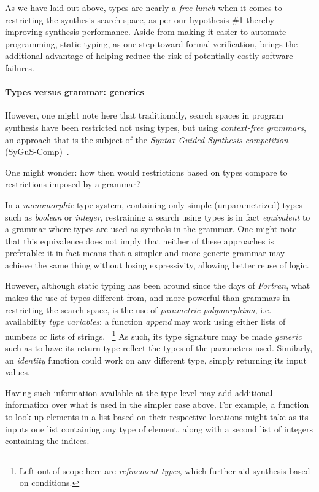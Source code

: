 \documentclass{article}
\begin{document}
As we have laid out above,
types are nearly a \emph{free lunch} when it comes to restricting the synthesis search space,
as per our hypothesis \#1
thereby improving synthesis performance.
Aside from making it easier to automate programming,
static typing, as one step toward formal verification,
brings the additional advantage of helping reduce the
risk of potentially costly software failures.%
~\citep{miller2018smart,leveson2001systemic}

\paragraph{Types versus grammar: generics}

However, one might note here that traditionally,
search spaces in program synthesis have been restricted not using types,
but using \emph{context-free grammars},
an approach that is the subject of the
\emph{Syntax-Guided Synthesis competition} (SyGuS-Comp)~\citep{sygus}.

One might wonder: how then would restrictions based on
types compare to restrictions imposed by a grammar?

In a \emph{monomorphic} type system,
containing only simple (unparametrized) types such as \emph{boolean} or \emph{integer},
restraining a search using types is in fact \emph{equivalent}
to a grammar where types are used as symbols in the grammar.
One might note that this equivalence does not imply
that neither of these approaches is preferable:
it in fact means that a simpler and more generic grammar
may achieve the same thing without losing expressivity,
allowing better reuse of logic.

However, although static typing has been around since the days of \emph{Fortran},
what makes the use of types different from,
and more powerful than grammars in restricting the search space,
is the use of \emph{parametric polymorphism}, i.e. availability \emph{type variables}:
a function \emph{append} may work using either lists of numbers or lists of strings.%
~\footnote{Left out of scope here are \emph{refinement types}, which further aid synthesis based on conditions.}
As such, its type signature may be made \emph{generic} such as to have its return type reflect the types of the parameters used.
Similarly, an \emph{identity} function could work on any different type, simply returning its input values.

Having such information available at the type level may add additional information over what is used in the simpler case above.
For example, a function to look up elements in a list based on their respective locations might take as its inputs one list containing any type of element, along with a second list of integers containing the indices.
\end{document}
